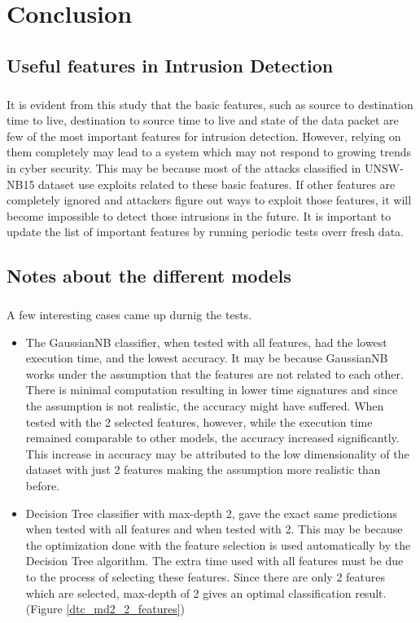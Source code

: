\chapter{Conclusion}

\section{Useful features in Intrusion Detection}

\paragraph{}
It is evident from this study that the basic features, such as source to destination time to live, destination to source time to live and state of the data packet are few of the most important features for intrusion detection. However, relying on them completely may lead to a system which may not respond to growing trends in cyber security. This may be because most of the attacks classified in UNSW-NB15 dataset use exploits related to these basic features. If other features are completely ignored and attackers figure out ways to exploit those features, it will become impossible to detect those intrusions in the future. It is important to update the list of important features by running periodic tests overr fresh data.

\section{Notes about the different models}

\paragraph{}
A few interesting cases came up durnig the tests.
\begin{itemize}
    \item The GaussianNB classifier, when tested with all features, had the lowest execution time, and the lowest accuracy. It may be because GaussianNB works under the assumption that the features are not related to each other. There is minimal computation resulting in lower time signatures and since the assumption is not realistic, the accuracy might have suffered. When tested with the 2 selected features, however, while the execution time remained comparable to other models, the accuracy increased significantly. This increase in accuracy may be attributed to the low dimensionality of the dataset with just 2 features making the assumption more realistic than before.
    \item Decision Tree classifier with max-depth 2, gave the exact same predictions when tested with all features and when tested with 2. This may be because the optimization done with the feature selection is used automatically by the Decision Tree algorithm. The extra time used with all features must be due to the process of selecting these features. Since there are only 2 features which are selected, max-depth of 2 gives an optimal classification result. (Figure \ref{dtc_md2_2_features})
\end{itemize}

